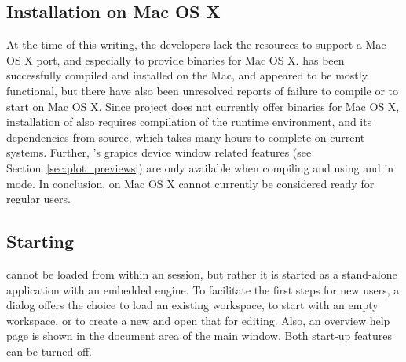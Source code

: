 \subsection{Installation on Mac OS X}
At the time of this writing, the developers lack the resources to support a Mac OS X port, and especially
to provide binaries for Mac OS X.  has been successfully compiled and installed on the Mac, and
appeared to be mostly functional, but there have also been unresolved reports of failure to compile or to start
 on Mac OS X. Since  project does not currently offer binaries for Mac OS X, installation
of  also requires compilation of the  runtime environment, and its dependencies from source,
which takes many hours to complete on current systems. Further, 's grapics device window related features
(see Section~\ref{sec:plot_previews}) are only available when compiling and using  and  in
 mode. In conclusion,  on Mac OS X cannot currently be considered ready for regular users.

\subsection[Starting RKWard]{Starting }
 cannot be loaded from within an 
session, but rather it is started as a stand-alone application with an
embedded  engine. To facilitate the first
steps for new users, a dialog offers the choice to load an existing
workspace, to start with an empty workspace, or to create a new
 and open that for editing. Also, an overview help page is
shown in the document area of the main window. Both start-up features
can be turned off.
